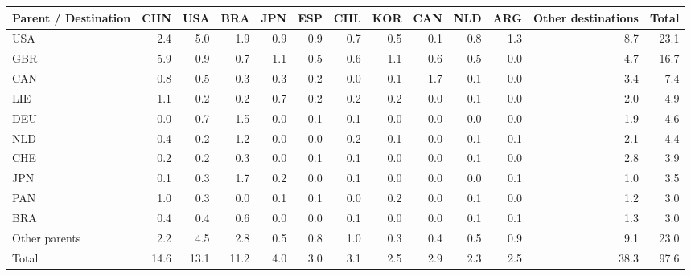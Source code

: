 \begin{tabular}{lrrrrrrrrrrrr}
\toprule
Parent / Destination & CHN & USA & BRA & JPN & ESP & CHL & KOR & CAN & NLD & ARG & Other destinations & Total \\
\midrule
USA & 2.4 & 5.0 & 1.9 & 0.9 & 0.9 & 0.7 & 0.5 & 0.1 & 0.8 & 1.3 & 8.7 & 23.1 \\
GBR & 5.9 & 0.9 & 0.7 & 1.1 & 0.5 & 0.6 & 1.1 & 0.6 & 0.5 & 0.0 & 4.7 & 16.7 \\
CAN & 0.8 & 0.5 & 0.3 & 0.3 & 0.2 & 0.0 & 0.1 & 1.7 & 0.1 & 0.0 & 3.4 & 7.4 \\
LIE & 1.1 & 0.2 & 0.2 & 0.7 & 0.2 & 0.2 & 0.2 & 0.0 & 0.1 & 0.0 & 2.0 & 4.9 \\
DEU & 0.0 & 0.7 & 1.5 & 0.0 & 0.1 & 0.1 & 0.0 & 0.0 & 0.0 & 0.0 & 1.9 & 4.6 \\
NLD & 0.4 & 0.2 & 1.2 & 0.0 & 0.0 & 0.2 & 0.1 & 0.0 & 0.1 & 0.1 & 2.1 & 4.4 \\
CHE & 0.2 & 0.2 & 0.3 & 0.0 & 0.1 & 0.1 & 0.0 & 0.0 & 0.1 & 0.0 & 2.8 & 3.9 \\
JPN & 0.1 & 0.3 & 1.7 & 0.2 & 0.0 & 0.1 & 0.0 & 0.0 & 0.0 & 0.1 & 1.0 & 3.5 \\
PAN & 1.0 & 0.3 & 0.0 & 0.1 & 0.1 & 0.0 & 0.2 & 0.0 & 0.1 & 0.0 & 1.2 & 3.0 \\
BRA & 0.4 & 0.4 & 0.6 & 0.0 & 0.0 & 0.1 & 0.0 & 0.0 & 0.1 & 0.1 & 1.3 & 3.0 \\
Other parents & 2.2 & 4.5 & 2.8 & 0.5 & 0.8 & 1.0 & 0.3 & 0.4 & 0.5 & 0.9 & 9.1 & 23.0 \\
\midrule
Total & 14.6 & 13.1 & 11.2 & 4.0 & 3.0 & 3.1 & 2.5 & 2.9 & 2.3 & 2.5 & 38.3 & 97.6 \\
\bottomrule
\end{tabular}
